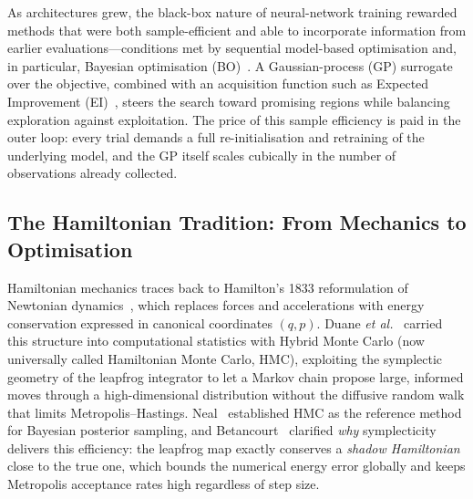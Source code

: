 \documentclass[11pt]{article}
\theoremstyle{definition}
\begin{document}
As architectures grew, the black-box nature of neural-network
training rewarded methods that were both sample-efficient and able to
incorporate information from earlier evaluations---conditions met by
sequential model-based optimisation and, in particular, Bayesian
optimisation (BO)~\cite{snoek2012}. A Gaussian-process (GP) surrogate
over the objective, combined with an acquisition function such as
Expected Improvement (EI)~\cite{mockus1975}, steers the search toward
promising regions while balancing exploration against exploitation.
The price of this sample efficiency is paid in the outer loop: every
trial demands a full re-initialisation and retraining of the
underlying model, and the GP itself scales cubically in the number of
observations already collected.

\subsection{The Hamiltonian Tradition: From Mechanics to Optimisation}

Hamiltonian mechanics traces back to Hamilton's 1833 reformulation of
Newtonian dynamics~\cite{goldstein2002}, which replaces forces and
accelerations with energy conservation expressed in canonical
coordinates $(q,p)$. Duane \emph{et al.}~\cite{duane1987} carried
this structure into computational statistics with Hybrid Monte Carlo
(now universally called Hamiltonian Monte Carlo, HMC), exploiting the
symplectic geometry of the leapfrog integrator to let a Markov chain
propose large, informed moves through a high-dimensional distribution
without the diffusive random walk that limits Metropolis--Hastings.
Neal~\cite{neal2011} established HMC as the reference method for
Bayesian posterior sampling, and Betancourt~\cite{betancourt2017}
clarified \emph{why} symplecticity delivers this efficiency: the
leapfrog map exactly conserves a \emph{shadow Hamiltonian} close to
the true one, which bounds the numerical energy error globally and
keeps Metropolis acceptance rates high regardless of step size.
\end{document}
